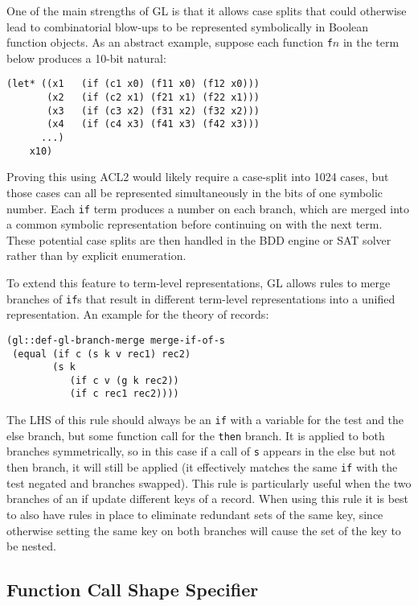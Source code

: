 \documentclass[submission,copyright,creativecommons]{eptcs}
\begin{document}
One of the main strengths of GL is that it allows case splits that
could otherwise lead to combinatorial blow-ups to be represented
symbolically in Boolean function objects.  As an abstract example,
suppose each function \texttt{f$n$} in the term below produces a
10-bit natural:
\begin{verbatim}
(let* ((x1   (if (c1 x0) (f11 x0) (f12 x0)))
       (x2   (if (c2 x1) (f21 x1) (f22 x1)))
       (x3   (if (c3 x2) (f31 x2) (f32 x2)))
       (x4   (if (c4 x3) (f41 x3) (f42 x3)))
      ...)
    x10)
\end{verbatim}
\noindent Proving this using ACL2 would likely require a case-split
into 1024 cases, but those cases can all be represented simultaneously
in the bits of one symbolic number.  Each \texttt{if}
term produces a number on each branch, which are merged into a common
symbolic representation before continuing on with the next term.
These potential case splits are then handled in the BDD engine or SAT
solver rather than by explicit enumeration.

To extend this feature to term-level representations, GL allows rules
to merge branches of \texttt{if}s that result in different term-level
representations into a unified representation. An
example for the theory of records:
\begin{verbatim}
(gl::def-gl-branch-merge merge-if-of-s
 (equal (if c (s k v rec1) rec2)
        (s k
           (if c v (g k rec2))
           (if c rec1 rec2))))  
\end{verbatim}
\noindent The LHS of this rule should always be an \texttt{if} with a
variable for the test and the else branch, but some function call for
the \texttt{then} branch.  It is applied to both branches
symmetrically, so in this case if a call of \texttt{s} appears in the
else but not then branch, it will still be applied (it effectively
matches the same \texttt{if} with the test negated and branches
swapped).
This rule is particularly useful when the two branches of an if update
different keys of a record.  When using this rule it is best to also
have rules in place to eliminate redundant sets of the same key, since
otherwise setting the same key on both branches will cause the set of
the key to be nested.

\subsection{Function Call Shape Specifier}
\label{sec:callshapespec}
\end{document}
